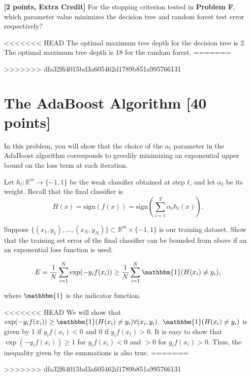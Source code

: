 \problem\textbf{[2 points, Extra Credit] }For the stopping criterion tested in \textbf{Problem F}, which parameter value minimizes the decision tree and random forest test error respectively? 

\begin{solution}
<<<<<<< HEAD
   The optimal maximum tree depth for the decision tree is 2. The optimal maximum tree depth is 18 for the random forest.
=======
   
>>>>>>> dfa32f64015bd3a605462d1789b851a995766131
\end{solution}



\newpage
\section{The AdaBoost Algorithm [40 points]}

In this problem, you will show that the choice of the $\alpha_t$ parameter in
the AdaBoost algorithm corresponds to greedily minimizing an exponential upper
bound on the loss term at each iteration.

\problem[3]
Let $h_t: \mathbb{R}^m \rightarrow \{-1,1\}$ be the weak classifier obtained at step $t$, and let $\alpha_t$ be
its weight. Recall that the final classifier is $$H(x) = \text{sign}(f(x)) = \text{sign} \left(\sum\limits_{i=1}^T \alpha_{t}h_t(x) \right).$$

Suppose $\{(x_1, y_1), ..., (x_N, y_N)\} \subset \mathbb{R}^m \times \{-1,1\}$ is our training dataset.  Show that the training set error of the final classifier can be bounded from
above if an an exponential loss function is used:

$$E = \frac{1}{N} \sum\limits_{i=1}^N \exp(-y_{i}f(x_i)) \geq \frac{1}{N} \sum\limits_{i=1}^N \mathbbm{1}(H(x_i) \neq y_i),$$

where $\mathbbm{1}$ is the indicator function.

\begin{solution}
<<<<<<< HEAD
    We will show that $\exp(-y_{i}f(x_i)) \ge \mathbbm{1}(H(x_i) \neq y_i) \forall (x_i, y_i)$. $\mathbbm{1}(H(x_i) \neq y_i)$ is given by 1 if $y_{i}f(x_i) < 0$ and 0 if $y_{i}f(x_i) > 0$. It is easy to show that $\exp(-y_{i}f(x_i)) \ge 1$ for $y_{i}f(x_i) < 0$ and $ > 0$ for $y_{i}f(x_i) > 0$. Thus, the inequality given by the summations is also true.
=======

>>>>>>> dfa32f64015bd3a605462d1789b851a995766131
\end{solution}

